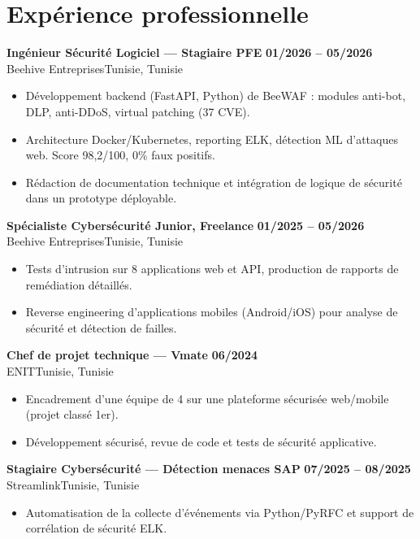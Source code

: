 \documentclass[a4paper,10pt]{article}
\newcommand{\cventry}[4]{\textbf{#1} \hfill \textbf{#4}\\[1pt]#2{\ifx\relax#3\relax\else, #3\fi}\par\vspace{1pt}}
\begin{document}
\section{Expérience professionnelle}
\cventry{Ingénieur Sécurité Logiciel --- Stagiaire PFE}{Beehive Entreprises}{Tunisie}{01/2026 -- 05/2026}
\begin{itemize}
  \item Développement backend (FastAPI, Python) de BeeWAF : modules anti-bot, DLP, anti-DDoS, virtual patching (37 CVE).
  \item Architecture Docker/Kubernetes, reporting ELK, détection ML d'attaques web. Score 98,2/100, 0\% faux positifs.
  \item Rédaction de documentation technique et intégration de logique de sécurité dans un prototype déployable.
\end{itemize}
\cventry{Spécialiste Cybersécurité Junior, Freelance}{Beehive Entreprises}{Tunisie}{01/2025 -- 05/2026}
\begin{itemize}
  \item Tests d'intrusion sur 8 applications web et API, production de rapports de remédiation détaillés.
  \item Reverse engineering d'applications mobiles (Android/iOS) pour analyse de sécurité et détection de failles.
\end{itemize}
\cventry{Chef de projet technique — Vmate}{ENIT}{Tunisie}{06/2024}
\begin{itemize}
  \item Encadrement d'une équipe de 4 sur une plateforme sécurisée web/mobile (projet classé 1er).
  \item Développement sécurisé, revue de code et tests de sécurité applicative.
\end{itemize}
\cventry{Stagiaire Cybersécurité — Détection menaces SAP}{Streamlink}{Tunisie}{07/2025 -- 08/2025}
\begin{itemize}
  \item Automatisation de la collecte d'événements via Python/PyRFC et support de corrélation de sécurité ELK.
\end{itemize}
\end{document}
